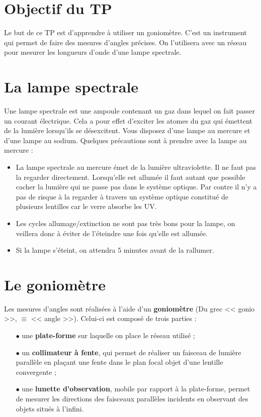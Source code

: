 \documentclass{tp}
\begin{document}

\section{Objectif du TP}
Le but de ce TP est d'apprendre à utiliser un goniomètre. C'est un instrument qui permet de faire des mesures d'angles précises. On l'utilisera avec un réseau pour mesurer les longueurs d'onde d'une lampe spectrale.

\section{La lampe spectrale}%
\label{sec:la_lampe_spectrale}
Une lampe spectrale est une ampoule contenant un gaz dans lequel on fait passer un courant électrique. Cela a pour effet d'exciter les atomes du gaz qui émettent de la lumière lorsqu'ils se désexcitent. Vous disposez d'une lampe au mercure et d'une lampe au sodium. Quelques précautions sont à prendre avec la lampe au mercure :

\begin{itemize}
  \item La lampe spectrale au mercure émet de la lumière ultraviolette. Il ne faut pas la regarder directement. Lorsqu'elle est allumée il faut autant que possible cacher la lumière qui ne passe pas dans le système optique. Par contre il n'y a pas de risque à la regarder à travers un système optique constitué de plusieurs lentilles car le verre absorbe les UV.

  \item Les cycles allumage/extinction ne sont pas très bons pour la lampe, on veillera donc à éviter de l'éteindre une fois qu'elle est allumée.

  \item Si la lampe s'éteint, on attendra 5 minutes avant de la rallumer.
\end{itemize}

\section{Le goniomètre}

\noindent Les mesures d'angles sont réalisées à l'aide d'un \textbf{goniomètre} (Du grec << gonio >>, $\equiv$ << angle >>). Celui-ci est composé de trois parties :
\vspace{0.1cm}

\begin{itemize}
	\item[$\bullet$] une \textbf{plate-forme} sur laquelle on place le réseau utilisé ;
	\item[$\bullet$] un \textbf{collimateur à fente}, qui permet de réaliser un faisceau de lumière parallèle en plaçant une fente dans le plan focal objet d'une lentille convergente ;
	\item[$\bullet$] une \textbf{lunette d'observation}, mobile par rapport à la plate-forme, permet de mesurer les directions des faisceaux parallèles incidents en observant des objets situés à l'infini.
\end{itemize}
\end{document}
